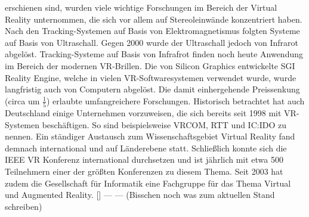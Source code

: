 \documentclass[a4paper,12pt,oneside]{article}
\begin{document}
        erschienen sind, wurden viele wichtige Forschungen im Bereich der Virtual Reality
        unternommen, die sich vor allem auf Stereoleinwände konzentriert haben.
        Nach den Tracking-Systemen auf Basis von Elektromagnetismus folgten Systeme auf
        Basis von Ultraschall. Gegen 2000 wurde der Ultraschall jedoch von Infrarot
        abgelöst. Tracking-Systeme auf Basis von Infrafrot finden noch heute Anwendung im
        Bereich der modernen VR-Brillen.
        Die von Silicon Graphics entwickelte SGI Reality Engine, welche in vielen
        VR-Softwaresystemen verwendet wurde, wurde langfristig auch von Computern
        abgelöst. Die damit einhergehende Preissenkung (circa um $\frac{1}{5}$)
        erlaubte umfangreichere Forschungen.
        Historisch betrachtet hat auch Deutschland einige Unternehmen vorzuweisen, die sich
        bereits seit 1998 mit VR-Systemen beschäftigen. So sind beispielsweise VRCOM, 
        RTT und IC:IDO zu nennen.
        Ein ständiger Austausch zum Wissenschaftsgebiet Virtual Reality fand demnach international
        und auf Länderebene statt. Schließlich konnte sich die IEEE VR Konferenz
        international durchsetzen und ist jährlich mit etwa 500 Teilnehmern einer der
        größten Konferenzen zu diesem Thema.
        Seit 2003 hat zudem die Gesellschaft für Informatik eine Fachgruppe für das Thema
        Virtual und Augmented Reality. [\cite[19-21]{Dorner2013}]
        --- --- (Bisschen noch was zum aktuellen Stand schreiben)
\end{document}

